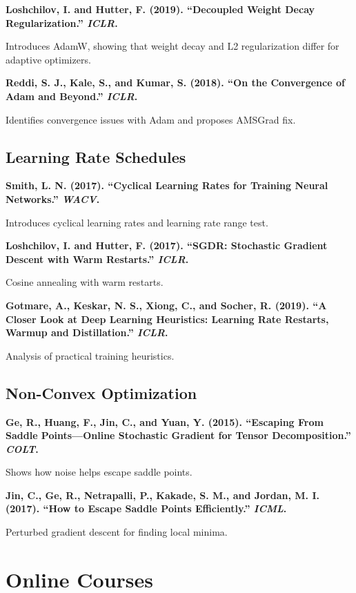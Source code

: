 \documentclass[../main.tex]{subfiles}
\begin{document}
\textbf{Loshchilov, I. and Hutter, F. (2019). ``Decoupled Weight Decay Regularization.'' \emph{ICLR}.}

Introduces AdamW, showing that weight decay and L2 regularization differ for adaptive optimizers.

\textbf{Reddi, S. J., Kale, S., and Kumar, S. (2018). ``On the Convergence of Adam and Beyond.'' \emph{ICLR}.}

Identifies convergence issues with Adam and proposes AMSGrad fix.

\subsection{Learning Rate Schedules}

\textbf{Smith, L. N. (2017). ``Cyclical Learning Rates for Training Neural Networks.'' \emph{WACV}.}

Introduces cyclical learning rates and learning rate range test.

\textbf{Loshchilov, I. and Hutter, F. (2017). ``SGDR: Stochastic Gradient Descent with Warm Restarts.'' \emph{ICLR}.}

Cosine annealing with warm restarts.

\textbf{Gotmare, A., Keskar, N. S., Xiong, C., and Socher, R. (2019). ``A Closer Look at Deep Learning Heuristics: Learning Rate Restarts, Warmup and Distillation.'' \emph{ICLR}.}

Analysis of practical training heuristics.

\subsection{Non-Convex Optimization}

\textbf{Ge, R., Huang, F., Jin, C., and Yuan, Y. (2015). ``Escaping From Saddle Points---Online Stochastic Gradient for Tensor Decomposition.'' \emph{COLT}.}

Shows how noise helps escape saddle points.

\textbf{Jin, C., Ge, R., Netrapalli, P., Kakade, S. M., and Jordan, M. I. (2017). ``How to Escape Saddle Points Efficiently.'' \emph{ICML}.}

Perturbed gradient descent for finding local minima.

\section{Online Courses}
\end{document}
